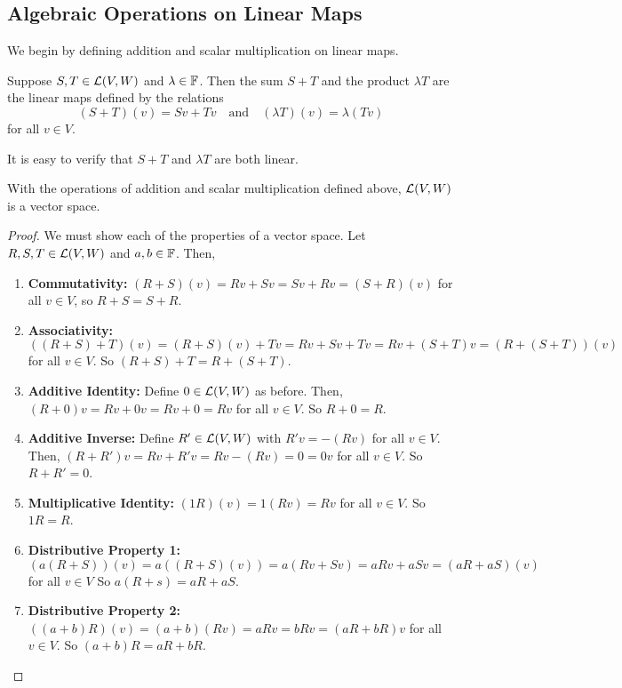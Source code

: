 \subsection*{Algebraic Operations on Linear Maps}
We begin by defining addition and scalar multiplication on linear maps.
\begin{definition}
    Suppose $S,T\in \mathcal{L}(V,W)$ and $\lambda\in\mathbb F$. Then the sum $S+T$ and the product $\lambda T$ are the linear maps defined by the relations
    \[ (S+T)(v) = Sv+  Tv \quad\text{and}\quad (\lambda T)(v) = \lambda (Tv)\]
    for all $v\in V$.
\end{definition}
It is easy to verify that $S+T$ and $\lambda T$ are both linear.   
\begin{theorem}
    With the operations of addition and scalar multiplication defined above, $\mathcal{L}(V,W)$ is a vector space.
\end{theorem}
\begin{proof}
    We must show each of the properties of a vector space. Let $R,S,T\in\mathcal{L}(V,W)$ and $a,b\in \mathbb F$. Then,
    \begin{enumerate}
        \item \textbf{Commutativity:} $(R+S)(v) =Rv + Sv = Sv + Rv = (S+R)(v)$ for all $v\in V$, so $R+S = S+R$.
        \item \textbf{Associativity:} $((R+S)+T)(v) = (R+S)(v) + Tv = Rv + Sv + Tv = Rv + (S+T)v = (R+(S+T))(v)$ for all $v\in V$. So $(R+S)+T = R+(S+T)$.
        \item \textbf{Additive Identity:} Define $0\in\mathcal{L}(V,W)$ as before. Then, $(R+0)v = Rv+0v = Rv+0 = Rv$ for all $v\in V$. So $R+0=R$.
        \item \textbf{Additive Inverse:} Define $R' \in \mathcal{L}(V,W)$ with $R'v = -(Rv)$ for all $v\in V$. Then, $(R+R')v = Rv + R'v = Rv - (Rv) = 0 = 0v$ for all $v\in V$. So $R + R' = 0$. 
        \item \textbf{Multiplicative Identity:} $(1R)(v) = 1(Rv) = Rv$ for all $v\in V$. So $1R = R$.
        \item \textbf{Distributive Property 1:} $(a(R+S))(v) = a((R+S)(v)) = a(Rv+Sv) = aRv + aSv = (aR+aS)(v)$ for all $v\in V$ So $a(R+s) = aR+aS$.
        \item \textbf{Distributive Property 2:} $((a+b)R)(v) = (a+b)(Rv) = aRv = bRv = (aR+bR)v$ for all $v\in V$. So $(a+b)R = aR+bR$.
    \end{enumerate}
\end{proof}
